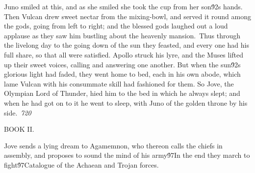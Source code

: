 {Juno smiled at this, and as she smiled she took the cup from her son\'92s hands. Then Vulcan drew sweet nectar from the mixing-bowl, and served it round among the gods, going from left to right; and the blessed gods laughed out a loud applause as they saw him bustling about the heavenly mansion.\
Thus through the livelong day to the going down of the sun they feasted, and every one had his full share, so that all were satisfied. Apollo struck his lyre, and the Muses lifted up their sweet voices, calling and answering one another. But when the sun\'92s glorious light had faded, they went home to bed, each in his own abode, which lame Vulcan with his consummate skill had fashioned for them. So Jove, the Olympian Lord of Thunder, hied him to the bed in which he always slept; and when he had got on to it he went to sleep, with Juno of the golden throne by his side.\
\pard{}\sl720\qc{}

  BOOK II.\
\pard\pardeftab720\qj{}

\fs25\fsmilli12800  Jove sends a lying dream to Agamemnon, who thereon calls the chiefs in assembly, and proposes to sound the mind of his army\'97In the end they march to fight\'97Catalogue of the Achaean and Trojan forces.\
\pard{}\qj{}

}
